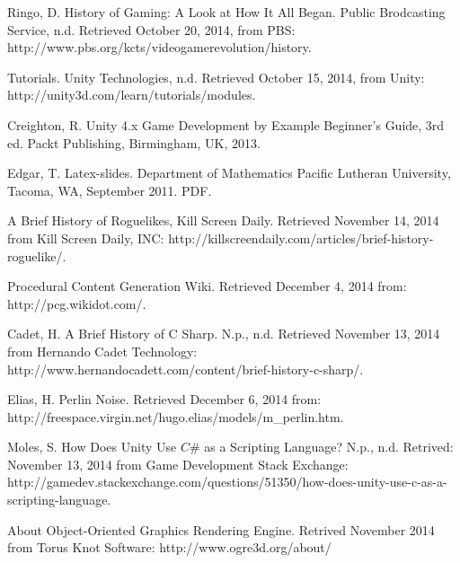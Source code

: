 \documentclass[12pt]{article}       %
\begin{document}


\newpage

\begin{thebibliography}{99}

 Ringo, D. History of Gaming: A Look at How It All Began. Public Brodcasting Service, n.d. Retrieved October 20, 2014, from PBS: http://www.pbs.org/kcts/videogamerevolution/history. 

 Tutorials. Unity Technologies, n.d. Retrieved October 15, 2014, from Unity: http://unity3d.com/learn/tutorials/modules.

 Creighton, R. Unity 4.x Game Development by Example Beginner's Guide, 3rd ed. Packt Publishing, Birmingham, UK, 2013.

 Edgar, T. Latex-slides. Department of Mathematics Pacific Lutheran University, Tacoma, WA, September 2011. PDF. 

 A Brief History of Roguelikes, Kill Screen Daily. Retrieved November 14, 2014 from Kill Screen Daily, INC: http://killscreendaily.com/articles/brief-history-roguelike/.

 Procedural Content Generation Wiki. Retrieved December 4, 2014 from: http://pcg.wikidot.com/.

 Cadet, H. A Brief History of C Sharp.  N.p., n.d. Retrieved November 13, 2014 from Hernando Cadet Technology:  http://www.hernandocadett.com/content/brief-history-c-sharp/.

 Elias, H. Perlin Noise. Retrieved December 6, 2014 from: http://freespace.virgin.net/hugo.elias/models/m\_perlin.htm.

 Moles, S. How Does Unity Use $C\#$ as a Scripting Language? N.p., n.d. Retrived: November 13, 2014 from Game Development Stack Exchange: http://gamedev.stackexchange.com/questions/51350/how-does-unity-use-c-as-a-scripting-language.

 About Object-Oriented Graphics Rendering Engine. Retrived November 2014 from Torus Knot Software: http://www.ogre3d.org/about/


\end{thebibliography}
\end{document}
